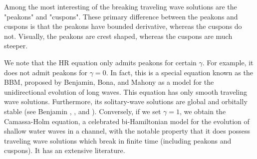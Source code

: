 \documentclass[12pt,reqno]{amsart}
\begin{document}
Among the most interesting of the breaking
traveling wave solutions are the "peakons" and
"cuspons". These primary difference between the peakons and cuspons is that the
peakons have bounded derivative, whereas the cuspons do not. Visually, the
peakons are crest shaped, whereas the cuspons are much steeper. 

We note that the HR equation only admits peakons for certain $\gamma$. 
For example, it does not admit peakons for $\gamma = 0$. In fact, this is a
special equation known as the BBM, proposed by 
Benjamin, Bona, and Mahony 
\cite{Benjamin_1972_Model-equations} as a model for 
the unidirectional evolution of long waves. This equation has only smooth
traveling wave solutions. Furthermore, 
its solitary-wave solutions are global and orbitally stable (see Benjamin 
\cite{Benjamin_1972_The-stability-o}, 
\cite{Benjamin_1972_Model-equations}, and 
\cite{Constantin_2000_Stability-of-a-}).
Conversely, if we set $\gamma =1$, we obtain the Camassa-Holm equation, a celebrated bi-Hamiltonian
model for the evolution of shallow water waves in a channel, with the notable
property that it does possess traveling wave solutions which break in
finite time (including peakons and cuspons). It has an extensive literature.
%
%
\end{document}
